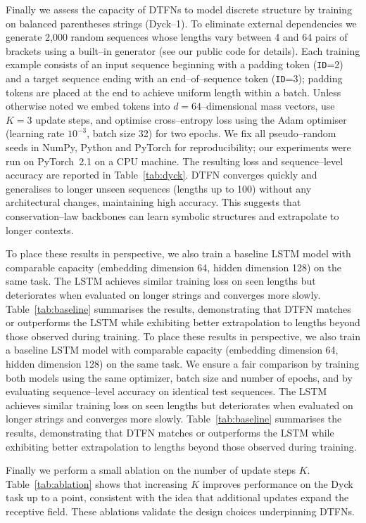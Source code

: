 \documentclass[10pt]{article}
\begin{document}
Finally we assess the capacity of DTFNs to model discrete structure by
training on balanced parentheses strings (Dyck--1).  To eliminate
external dependencies we generate 2{,}000 random sequences whose lengths
vary between 4 and 64 pairs of brackets using a built--in generator
(see our public code for details).  Each training example consists of
an input sequence beginning with a padding token (\texttt{ID}=2) and a
target sequence ending with an end--of--sequence token (\texttt{ID}=3);
padding tokens are placed at the end to achieve uniform length within a
batch.  Unless otherwise noted we embed tokens into $d=64$--dimensional
mass vectors, use $K=3$ update steps, and optimise cross--entropy loss
using the Adam optimiser (learning rate $10^{-3}$, batch size 32) for
two epochs.  We fix all pseudo--random seeds in NumPy, Python and
PyTorch for reproducibility; our experiments were run on PyTorch~2.1 on
a CPU machine.  The resulting loss and sequence--level accuracy are
reported in Table~\ref{tab:dyck}.  DTFN converges quickly and
generalises to longer unseen sequences (lengths up to 100) without any
architectural changes, maintaining high accuracy.  This suggests that
conservation--law backbones can learn symbolic structures and extrapolate
to longer contexts.

To place these results in perspective, we also train a baseline
LSTM model with comparable capacity (embedding dimension 64, hidden
dimension 128) on the same task.  The LSTM achieves similar training
loss on seen lengths but deteriorates when evaluated on longer strings
and converges more slowly.  Table~\ref{tab:baseline} summarises the
results, demonstrating that DTFN matches or outperforms the LSTM while
exhibiting better extrapolation to lengths beyond those observed during
training.
To place these results in perspective, we also train a baseline
LSTM model with comparable capacity (embedding dimension 64, hidden
dimension 128) on the same task.  We ensure a fair comparison by
training both models using the same optimizer, batch size and number of
epochs, and by evaluating sequence--level accuracy on identical test
sequences.  The LSTM achieves similar training loss on seen lengths but
deteriorates when evaluated on longer strings and converges more
slowly.  Table~\ref{tab:baseline} summarises the results, demonstrating
that DTFN matches or outperforms the LSTM while exhibiting better
extrapolation to lengths beyond those observed during training.

Finally we perform a small ablation on the number of update steps $K$.
Table~\ref{tab:ablation} shows that increasing $K$ improves
performance on the Dyck task up to a point, consistent with the idea
that additional updates expand the receptive field.  These ablations
validate the design choices underpinning DTFNs.
\end{document}
